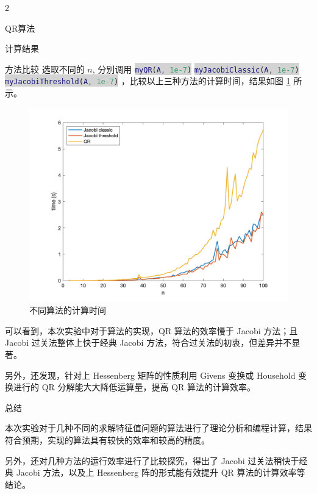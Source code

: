 \documentclass[a4paper]{article}
\newcommand{\inlinecode}[2]{\colorbox{lightgray}{\lstinline[language=#1]$#2$}}
\begin{document}
\begin{multicols}{2}
\begin{section}{QR算法}
\begin{subsection}{计算结果}
	\end{subsection}
	
\end{section}

\begin{section}{方法比较}
	选取不同的 $n$, 分别调用 \inlinecode{Matlab}{myQR(A, 1e-7)} \inlinecode{Matlab}{myJacobiClassic(A, 1e-7)} \inlinecode{Matlab}{myJacobiThreshold(A, 1e-7)} ，比较以上三种方法的计算时间，结果如图 \ref{cp_time} 所示。
	
	\begin{figure}[ht] %
		\centering %
		\includegraphics[width = \textwidth]{img/compare_time.png} 
		\caption{不同算法的计算时间}
		\label{cp_time} 
	\end{figure}	
	
	可以看到，本次实验中对于算法的实现，QR 算法的效率慢于 Jacobi 方法；且 Jacobi 过关法整体上快于经典 Jacobi 方法，符合过关法的初衷，但差异并不显著。
	
	另外，还发现，针对上 Hessenberg 矩阵的性质利用 Givens 变换或 Household 变换进行的 QR 分解能大大降低运算量，提高 QR 算法的计算效率。
	
\end{section}

\begin{section}{总结}
	
	本次实验对于几种不同的求解特征值问题的算法进行了理论分析和编程计算，结果符合预期，实现的算法具有较快的效率和较高的精度。
	
	另外，还对几种方法的运行效率进行了比较探究，得出了 Jacobi 过关法稍快于经典 Jacobi 方法，以及上 Hessenberg 阵的形式能有效提升 QR 算法的计算效率等结论。
	
\end{section}

\end{multicols}



%
%

\end{document}

